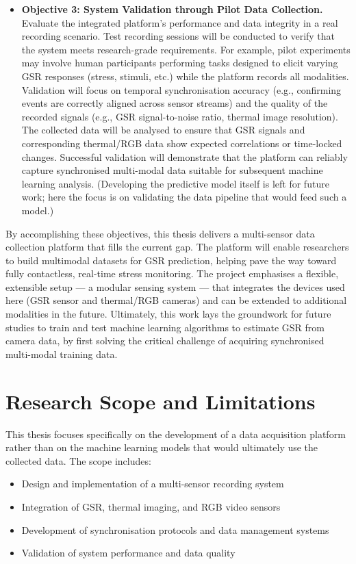 \begin{itemize}
\item \textbf{Objective 3: System Validation through Pilot Data Collection.} Evaluate the integrated platform's performance and data integrity in a real recording scenario. Test recording sessions will be conducted to verify that the system meets research-grade requirements. For example, pilot experiments may involve human participants performing tasks designed to elicit varying GSR responses (stress, stimuli, etc.) while the platform records all modalities. Validation will focus on temporal synchronisation accuracy (e.g., confirming events are correctly aligned across sensor streams) and the quality of the recorded signals (e.g., GSR signal-to-noise ratio, thermal image resolution). The collected data will be analysed to ensure that GSR signals and corresponding thermal/RGB data show expected correlations or time-locked changes. Successful validation will demonstrate that the platform can reliably capture synchronised multi-modal data suitable for subsequent machine learning analysis. (Developing the predictive model itself is left for future work; here the focus is on validating the data pipeline that would feed such a model.)
\end{itemize}

By accomplishing these objectives, this thesis delivers a multi-sensor data collection platform that fills the current gap. The platform will enable researchers to build multimodal datasets for GSR prediction, helping pave the way toward fully contactless, real-time stress monitoring. The project emphasises a flexible, extensible setup --- a modular sensing system --- that integrates the devices used here (GSR sensor and thermal/RGB cameras) and can be extended to additional modalities in the future. Ultimately, this work lays the groundwork for future studies to train and test machine learning algorithms to estimate GSR from camera data, by first solving the critical challenge of acquiring synchronised multi-modal training data.

\section{Research Scope and Limitations}

This thesis focuses specifically on the development of a data acquisition platform rather than on the machine learning models that would ultimately use the collected data. The scope includes:

\begin{itemize}
\item Design and implementation of a multi-sensor recording system
\item Integration of GSR, thermal imaging, and RGB video sensors
\item Development of synchronisation protocols and data management systems
\item Validation of system performance and data quality
\end{itemize}

